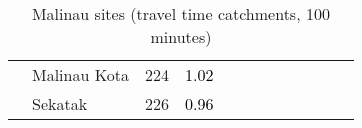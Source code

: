 \begin{table}[ht]
\begin{tabular}{C{0.03\textwidth}C{0.12\textwidth}C{0.09\textwidth}C{0.08\textwidth}C{0.08\textwidth}C{0.08\textwidth}C{0.07\textwidth}C{0.07\textwidth}C{0.07\textwidth}C{0.07\textwidth}}
   & Malinau Kota & 224 & \textcolor[HTML]{000000}{1.02} & \textcolor[HTML]{FFFFFF}{0.35} & \textcolor[HTML]{FFFFFF}{3} &  &  &  &  \\ 
   & Sekatak & 226 & \textcolor[HTML]{000000}{0.96} & \textcolor[HTML]{FFFFFF}{0.33} & \textcolor[HTML]{FFFFFF}{3} &  &  &  &  \\ 
  \end{tabular}
\endgroup
\caption{Malinau sites (travel time catchments, 100 minutes)} 
\label{tab:malinau_time}
\end{table}
